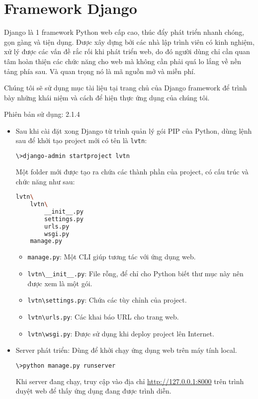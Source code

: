 \section{Framework Django}
Django là 1 framework Python web cấp cao, thúc đẩy phát triển nhanh chóng, gọn gàng và tiện dụng. Được xây dựng bởi các nhà lập trình viên có kinh nghiệm, xử lý được các vấn đề rắc rối khi phát triển web, do đó người dùng chỉ cần quan tâm hoàn thiện các chức năng cho web mà không cần phải quá lo lắng về nền tảng phía sau. Và quan trọng nó là mã nguồn mở và miễn phí.
\par
Chúng tôi sẽ sử dụng mục tài liệu\cite{django} tại trang chủ của Django framework để trình bày những khái niệm và cách để hiện thực ứng dụng của chúng tôi.
\par
Phiên bản sử dụng: 2.1.4
\begin{itemize}
	\item Sau khi cài đặt xong Django từ trình quản lý gói PIP của Python, dùng lệnh sau để khởi tạo project mới có tên là \texttt{lvtn}:
	\begin{lstlisting}[language=bash]
\>django-admin startproject lvtn
	\end{lstlisting}
	Một folder mới được tạo ra chứa các thành phần của project, có cấu trúc và chức năng như sau:
	\begin{lstlisting}[language=bash]
lvtn\
	lvtn\
		__init__.py
		settings.py
		urls.py
		wsgi.py
	manage.py
	\end{lstlisting}
	\begin{itemize}
		\item \texttt{manage.py}: Một CLI giúp tương tác với ứng dụng web.
		\item \texttt{lvtn\textbackslash\_\_init\_\_.py}: File rỗng, để chỉ cho Python biết thư mục này nên được xem là một gói.
		\item \texttt{lvtn\textbackslash settings.py}: Chứa các tùy chỉnh của project.
		\item \texttt{lvtn\textbackslash urls.py}: Các khai báo URL cho trang web.
		\item \texttt{lvtn\textbackslash wsgi.py}: Được sử dụng khi deploy project lên Internet.
	\end{itemize}
	\item Server phát triển: Dùng để khởi chạy ứng dụng web trên máy tính local.
	\begin{lstlisting}[language=bash]
\>python manage.py runserver
	\end{lstlisting}
	Khi server đang chạy, truy cập vào địa chỉ \url{http://127.0.0.1:8000} trên trình duyệt web để thấy ứng dụng đang được trình diễn.

\end{itemize}
